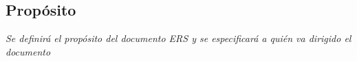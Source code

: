 \subsection{Propósito}
\par \emph{Se  definirá  el  propósito  del  documento  ERS  y  se  especificará  a  quién  va  dirigido  el documento}

